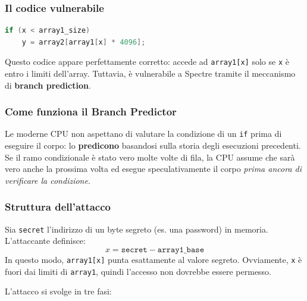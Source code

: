 \documentclass{article}
\begin{document}
\subsubsection*{Il codice vulnerabile}

\begin{lstlisting}[language=C]
if (x < array1_size)
    y = array2[array1[x] * 4096];
\end{lstlisting}

Questo codice appare perfettamente corretto: accede ad \texttt{array1[x]} 
solo se \texttt{x} è entro i limiti dell'array. Tuttavia, è vulnerabile 
a Spectre tramite il meccanismo di \textbf{branch prediction}.

\subsubsection*{Come funziona il Branch Predictor}

Le moderne CPU non aspettano di valutare la condizione di un \texttt{if} 
prima di eseguire il corpo: lo \textbf{predicono} basandosi sulla storia 
degli esecuzioni precedenti. Se il ramo condizionale è stato vero molte 
volte di fila, la CPU assume che sarà vero anche la prossima volta ed 
esegue speculativamente il corpo \textit{prima ancora di verificare la 
condizione}.

\subsubsection*{Struttura dell'attacco}

Sia \texttt{secret} l'indirizzo di un byte segreto (es. una password) 
in memoria. L'attaccante definisce:
\[
    x = \texttt{secret} - \texttt{array1\_base}
\]
In questo modo, \texttt{array1[x]} punta esattamente al valore segreto.
Ovviamente, \texttt{x} è fuori dai limiti di \texttt{array1}, quindi 
l'accesso non dovrebbe essere permesso.

L'attacco si svolge in tre fasi:
\end{document}
